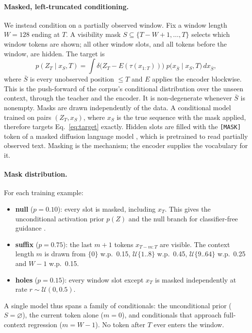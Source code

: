 \documentclass[11pt]{article}
\newcommand{\MASK}{\texttt{[MASK]}}
\begin{document}
\paragraph{Masked, left-truncated conditioning.} We instead condition on a partially observed window. Fix a window
length $W = 128$ ending at $T$. A visibility mask $S \subseteq \{T-W+1, \dots, T\}$ selects which window tokens are shown;
all other window slots, and all tokens before the window, are hidden. The target is
\begin{equation}
  p(Z_T \mid x_S, T) = \int \delta\big(Z_T - E(\tau(x_{1:T}))\big)\; p\big(x_{\bar S}\mid x_S, T\big)\, dx_{\bar S},
  \label{eq:target}
\end{equation}
where $\bar S$ is every unobserved position $\le T$ and $E$ applies the encoder blockwise. This is the push-forward of
the corpus's conditional distribution over the unseen context, through the teacher and the encoder. It is non-degenerate
whenever $\bar S$ is nonempty. Masks are drawn independently of the data. A conditional model trained on pairs
$(Z_T, x_S)$, where $x_S$ is the true sequence with the mask applied, therefore targets Eq.~\eqref{eq:target} exactly.
Hidden slots are filled with the \MASK{} token of a masked diffusion language model \citep{sahoo2024mdlm}, which is
pretrained to read partially observed text. Masking is the mechanism; the encoder supplies the vocabulary for it.

\paragraph{Mask distribution.} For each training example:
\begin{itemize}[leftmargin=1.5em]
  \item \textbf{null} ($p = 0.10$): every slot is masked, including $x_T$. This gives the unconditional activation prior
    $p(Z)$ and the null branch for classifier-free guidance \citep{ho2022cfg}.
  \item \textbf{suffix} ($p = 0.75$): the last $m+1$ tokens $x_{T-m:T}$ are visible. The context length $m$ is drawn from
    $\{0\}$ w.p.\ 0.15, $\mathcal{U}\{1..8\}$ w.p.\ 0.45, $\mathcal{U}\{9..64\}$ w.p.\ 0.25 and $W-1$ w.p.\ 0.15.
  \item \textbf{holes} ($p = 0.15$): every window slot except $x_T$ is masked independently at rate $r\sim\mathcal{U}(0, 0.5)$.
\end{itemize}
A single model thus spans a family of conditionals: the unconditional prior ($S = \varnothing$), the current token alone
($m = 0$), and conditionals that approach full-context regression ($m = W-1$). No token after $T$ ever enters the window.
\end{document}
